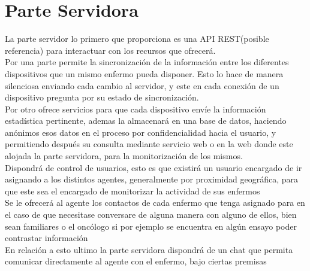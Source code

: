 \documentclass[../pfc.tex]{subfiles}
\begin{document}
	\section{Parte Servidora}
	
	La parte servidor lo primero que proporciona es una API REST(posible referencia) para interactuar con los recursos que ofrecerá.\\
	
	Por una parte permite la sincronización de la información entre los diferentes dispositivos  que un mismo enfermo pueda disponer. Esto lo hace de manera silenciosa enviando cada cambio al servidor, y este en cada conexión de un dispositivo pregunta por su estado de sincronización.\\
	
	Por otro ofrece servicios para que cada dispositivo envíe la información estadística pertinente, ademas la almacenará en una base de datos, haciendo anónimos esos datos en el proceso por confidencialidad hacia el usuario, y permitiendo después su consulta mediante servicio web o en la web donde este alojada la parte servidora, para la monitorización de los mismos.\\
	
	Dispondrá de control de usuarios, esto es que existirá un usuario encargado de ir asignando a los distintos agentes, generalmente por proximidad geográfica, para que este sea el encargado de monitorizar la actividad de sus enfermos \\
	
	Se le ofrecerá al agente los contactos de cada enfermo que tenga asignado para en el caso de que necesitase conversare de alguna manera con alguno de ellos, bien sean familiares o el oncólogo si por ejemplo se encuentra en algún ensayo poder contrastar información\\
	
	En relación a esto ultimo la parte servidora dispondrá de un chat que permita comunicar directamente al agente con el enfermo, bajo ciertas premisas 
	
\end{document}
